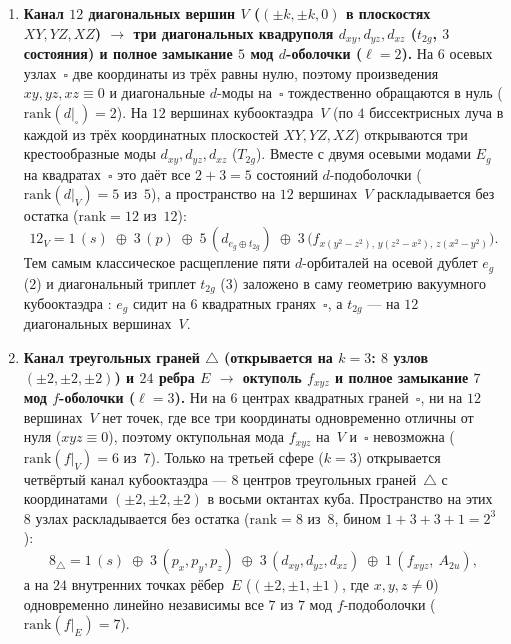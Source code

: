 \begin{enumerate}[leftmargin=*]
\item \textbf{Канал $12$ диагональных вершин $V$ ($(\pm k,\pm k,0)$ в плоскостях $XY,YZ,XZ$)
  $\longrightarrow$ три диагональных квадруполя $d_{xy},d_{yz},d_{xz}$ ($t_{2g}$, $3$ состояния) и полное замыкание $5$ мод $d$-оболочки ($\ell=2$).}
  На $6$ осевых узлах~$\square$ две координаты из трёх равны нулю, поэтому произведения $xy,yz,xz\equiv 0$
  и диагональные $d$-моды на~$\square$ тождественно обращаются в нуль ($\mathrm{rank}(d|_{\square})=2$).
  На $12$ вершинах кубооктаэдра~$V$ (по $4$ биссектрисных луча в каждой из трёх координатных плоскостей $XY,YZ,XZ$)
  открываются три крестообразные моды $d_{xy},d_{yz},d_{xz}$ ($T_{2g}$).
  Вместе с двумя осевыми модами $E_g$ на квадратах~$\square$ это даёт все $2+3=5$ состояний $d$-подоболочки
  ($\mathrm{rank}(d|_V)=5$ из~$5$), а пространство на $12$ вершинах~$V$ раскладывается без остатка ($\mathrm{rank}=12$ из~$12$):
  \[
    12_{V}
    = 1\,(s)
    \;\oplus\;
    3\,(p)
    \;\oplus\;
    5\,(d_{e_g\oplus t_{2g}})
    \;\oplus\;
    3\,\bigl(f_{x(y^2-z^2),\,y(z^2-x^2),\,z(x^2-y^2)}\bigr).
  \]
  Тем самым классическое расщепление пяти $d$-орбиталей на осевой дублет $e_g$ ($2$) и диагональный триплет $t_{2g}$ ($3$)
  заложено в саму геометрию вакуумного кубооктаэдра \latGCKshort: $e_g$ сидит на $6$ квадратных гранях~$\square$,
  а $t_{2g}$ --- на $12$ диагональных вершинах~$V$.

\item \textbf{Канал треугольных граней $\triangle$ (открывается на $k=3$: $8$ узлов $(\pm 2,\pm 2,\pm 2)$) и $24$ ребра $E$
  $\longrightarrow$ октуполь $f_{xyz}$ и полное замыкание $7$ мод $f$-оболочки ($\ell=3$).}
  Ни на $6$ центрах квадратных граней~$\square$, ни на $12$ вершинах~$V$ нет точек, где все три координаты
  одновременно отличны от нуля ($xyz\equiv 0$), поэтому октупольная мода $f_{xyz}$ на~$V$ и~$\square$
  невозможна ($\mathrm{rank}(f|_V)=6$ из~$7$).
  Только на третьей сфере ($k=3$) открывается четвёртый канал кубооктаэдра --- $8$ центров треугольных граней~$\triangle$
  с координатами $(\pm 2,\pm 2,\pm 2)$ в восьми октантах куба.
  Пространство на этих $8$ узлах раскладывается без остатка ($\mathrm{rank}=8$ из~$8$, бином $1+3+3+1=2^3$):
  \[
    8_{\triangle}
    = 1\,(s)
    \;\oplus\;
    3\,(p_x,p_y,p_z)
    \;\oplus\;
    3\,(d_{xy},d_{yz},d_{xz})
    \;\oplus\;
    1\,(f_{xyz},\ A_{2u}),
  \]
  а на $24$ внутренних точках рёбер~$E$ ($(\pm 2,\pm 1,\pm 1)$, где $x,y,z\neq 0$) одновременно линейно независимы
  все $7$ из $7$ мод $f$-подоболочки ($\mathrm{rank}(f|_E)=7$).
\end{enumerate}

